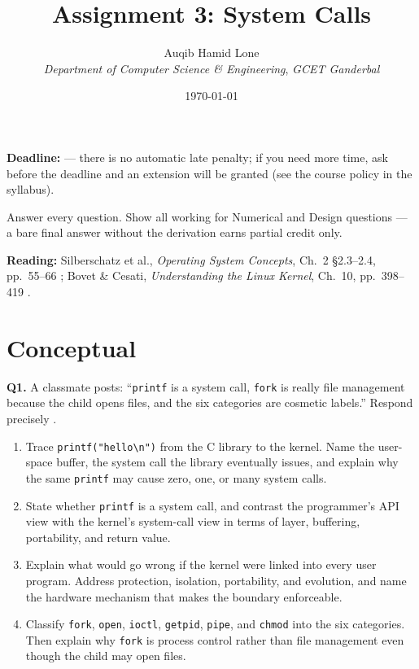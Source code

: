 \documentclass[11pt]{article}
\title{Assignment 3: System Calls}
\author{Auqib Hamid Lone\\[0.3em]
  \emph{Department of Computer Science \& Engineering}, \emph{GCET Ganderbal}}
\date{\today}
\begin{document}
\maketitle

\noindent\textbf{Deadline:}  --- there is no automatic late penalty; if you need more time, ask before the deadline and an extension will be granted (see the course policy in the syllabus).

\noindent Answer every question. Show all working for Numerical and Design questions --- a bare final answer without the derivation earns partial credit only.

\noindent\textbf{Reading:} Silberschatz et al., \emph{Operating System Concepts}, Ch.~2 \S2.3--2.4, pp.~55--66 \cite{SilberschatzOSC_operating_system_concepts}; Bovet \& Cesati, \emph{Understanding the Linux Kernel}, Ch.~10, pp.~398--419 \cite{BovetCesati_understanding_linux_kernel}.

\section{Conceptual}

\textbf{Q1.} A classmate posts: ``\texttt{printf} is a system call, \texttt{fork} is really file management because the child opens files, and the six categories are cosmetic labels.'' Respond precisely \cite{SilberschatzOSC_operating_system_concepts}.
\begin{enumerate}
  \item[(a)] Trace \texttt{printf("hello\textbackslash n")} from the C library to the kernel. Name the user-space buffer, the system call the library eventually issues, and explain why the same \texttt{printf} may cause zero, one, or many system calls.
  \item[(b)] State whether \texttt{printf} is a system call, and contrast the programmer's API view with the kernel's system-call view in terms of layer, buffering, portability, and return value.
  \item[(c)] Explain what would go wrong if the kernel were linked into every user program. Address protection, isolation, portability, and evolution, and name the hardware mechanism that makes the boundary enforceable.
  \item[(d)] Classify \texttt{fork}, \texttt{open}, \texttt{ioctl}, \texttt{getpid}, \texttt{pipe}, and \texttt{chmod} into the six categories. Then explain why \texttt{fork} is process control rather than file management even though the child may open files.
\end{enumerate}
\end{document}
